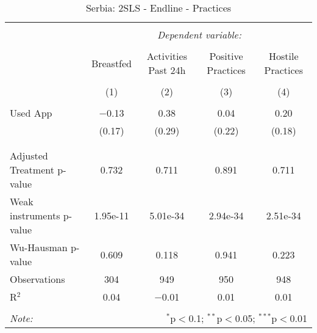 
\begin{table}[!htbp] \centering 
  \caption{Serbia: 2SLS - Endline - Practices} 
  \label{tbl:Serbia: 2SLS - Endline - Practices} 
\begin{tabular}{@{\extracolsep{5pt}}lcccc} 
\\[-1.8ex]\hline 
\hline \\[-1.8ex] 
 & \multicolumn{4}{c}{\textit{Dependent variable:}} \\ 
\cline{2-5} 
\\[-1.8ex] & Breastfed & Activities Past 24h & Positive Practices & Hostile Practices \\ 
\\[-1.8ex] & (1) & (2) & (3) & (4)\\ 
\hline \\[-1.8ex] 
 Used App & $-$0.13 & 0.38 & 0.04 & 0.20 \\ 
  & (0.17) & (0.29) & (0.22) & (0.18) \\ 
  & & & & \\ 
\hline \\[-1.8ex] 
Adjusted Treatment p-value & 0.732 & 0.711 & 0.891 & 0.711 \\ 
Weak instruments p-value & 1.95e-11 & 5.01e-34 & 2.94e-34 & 2.51e-34 \\ 
Wu-Hausman p-value & 0.609 & 0.118 & 0.941 & 0.223 \\ 
Observations & 304 & 949 & 950 & 948 \\ 
R$^{2}$ & 0.04 & $-$0.01 & 0.01 & 0.01 \\ 
\hline 
\hline \\[-1.8ex] 
\textit{Note:}  & \multicolumn{4}{r}{$^{*}$p$<$0.1; $^{**}$p$<$0.05; $^{***}$p$<$0.01} \\ 
\end{tabular} 
\end{table} 
